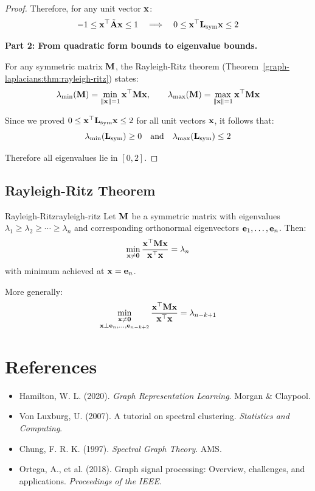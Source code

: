 \begin{notechapter}
\begin{proof}
Therefore, for any unit vector $\mathbf{x}$:
\[
-1 \leq \mathbf{x}^\top \tilde{\mathbf{A}} \mathbf{x} \leq 1 \quad \Longrightarrow \quad 0 \leq \mathbf{x}^\top \mathbf{L}_{\text{sym}} \mathbf{x} \leq 2
\]

\textbf{Part 2: From quadratic form bounds to eigenvalue bounds.}

For any symmetric matrix $\mathbf{M}$, the Rayleigh-Ritz theorem (Theorem~\ref{graph-laplacians:thm:rayleigh-ritz}) states:
\[
\lambda_{\min}(\mathbf{M}) = \min_{\|\mathbf{x}\| = 1} \mathbf{x}^\top \mathbf{M} \mathbf{x}, \qquad \lambda_{\max}(\mathbf{M}) = \max_{\|\mathbf{x}\| = 1} \mathbf{x}^\top \mathbf{M} \mathbf{x}
\]

Since we proved $0 \leq \mathbf{x}^\top \mathbf{L}_{\text{sym}} \mathbf{x} \leq 2$ for all unit vectors $\mathbf{x}$, it follows that:
\[
\lambda_{\min}(\mathbf{L}_{\text{sym}}) \geq 0 \quad \text{and} \quad \lambda_{\max}(\mathbf{L}_{\text{sym}}) \leq 2
\]

Therefore all eigenvalues lie in $[0, 2]$.
\end{proof}

\subsection{Rayleigh-Ritz Theorem}

\begin{theorem}{Rayleigh-Ritz}{rayleigh-ritz}
Let $\mathbf{M}$ be a symmetric matrix with eigenvalues $\lambda_1 \geq \lambda_2 \geq \cdots \geq \lambda_n$ and corresponding orthonormal eigenvectors $\mathbf{e}_1, \ldots, \mathbf{e}_n$. Then:
\begin{equation}
\min_{\mathbf{x} \neq \mathbf{0}} \frac{\mathbf{x}^\top \mathbf{M} \mathbf{x}}{\mathbf{x}^\top \mathbf{x}} = \lambda_n
\end{equation}
with minimum achieved at $\mathbf{x} = \mathbf{e}_n$.

More generally:
\begin{equation}
\min_{\substack{\mathbf{x} \neq \mathbf{0} \\ \mathbf{x} \perp \mathbf{e}_n, \ldots, \mathbf{e}_{n-k+2}}} \frac{\mathbf{x}^\top \mathbf{M} \mathbf{x}}{\mathbf{x}^\top \mathbf{x}} = \lambda_{n-k+1}
\end{equation}
\end{theorem}

\section{References}

\begin{itemize}
    \item Hamilton, W. L. (2020). \emph{Graph Representation Learning}. Morgan \& Claypool.
    \item Von Luxburg, U. (2007). A tutorial on spectral clustering. \emph{Statistics and Computing}.
    \item Chung, F. R. K. (1997). \emph{Spectral Graph Theory}. AMS.
    \item Ortega, A., et al. (2018). Graph signal processing: Overview, challenges, and applications. \emph{Proceedings of the IEEE}.
\end{itemize}
\end{notechapter}
